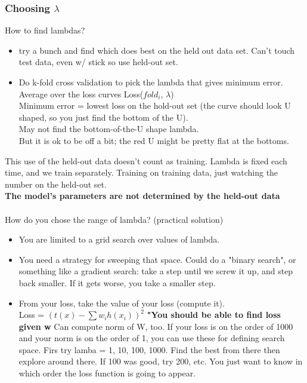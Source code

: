 \subsubsection{Choosing $\lambda$}
How to find lambdas? 
\begin{itemize}
	\item try a bunch and find which does best on the held out data set.  
		Can't touch test data, even w/ stick so use held-out set. 
	\item Do k-fold cross validation to pick the lambda that gives minimum error. \hfill \\
		Average over the loss curves Loss($fold_i$, $\lambda$) \hfill \\ 
		Minimum error = lowest loss on the hold-out set (the curve should look U shaped, so you just find the bottom of the U).  \hfill \\
		May not find the bottom-of-the-U shape lambda.    \hfill \\
		But it is ok to be off a bit; the red U might be pretty flat at the bottoms. \hfill \\
\end{itemize}		
This use of the held-out data doesn't count as training.  
Lambda is fixed each time, and we train separately. 
Training on training data, just watching the number on the held-out set. \hfill \\
\textbf{The model's parameters are not determined by the held-out data} \hfill \\
\hfill \\

How do you chose the range of lambda? (practical solution) 
\begin{itemize}
	\item You are limited to a grid search over values of lambda. 
	\item You need a strategy for sweeping that space.   
		Could do a "binary search", or something like a gradient search: 
		take a step until we screw it up, and step back smaller.   
		If it gets worse, you take a smaller step.
	\item From your loss, take the value of your loss (compute it).  \hfill \\
		Loss = $(t(x) - \sum w_i h(x_i))^2$  
        		\textbf{"You should be able to find loss given w}
            	Can compute norm of W, too.  
		If your loss is on the order of 1000 and your norm is on the order of 1, you can use these for defining search space.
                	Firs try lamba = 1, 10, 100, 1000.  
		Find the best from there then explore around there.
		If 100 was good, try 200, etc.   
		You just want to know in which order the loss function is going to appear. 
\end{itemize}

